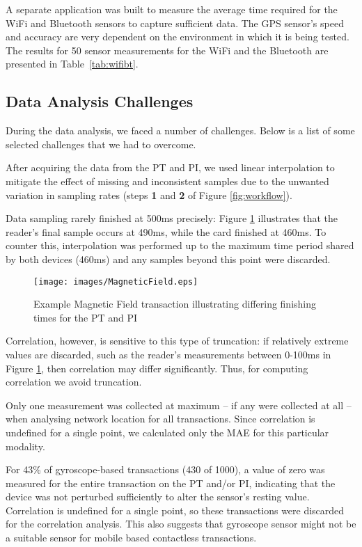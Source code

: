 \documentclass{article}
\begin{document}
        A separate application was built to measure the average time required for the WiFi and Bluetooth sensors to capture sufficient data.
		The GPS sensor's speed and accuracy are very dependent on the environment in which it is being tested.
		The results for 50 sensor measurements for the WiFi and the Bluetooth are presented in Table~\ref{tab:wifibt}.




\subsection{Data Analysis Challenges}
\label{sec:Data_Analaysis_Challenge}

During the data analysis, we faced a number of challenges.  Below is a list of some selected challenges that we had to overcome. 


After acquiring the data from the PT and PI, we used linear interpolation to mitigate the effect of missing and inconsistent samples due to the unwanted variation in sampling rates (steps \textbf{1} and \textbf{2} of Figure \ref{fig:workflow}).



Data sampling rarely finished at 500ms precisely: Figure \ref{fig:magfield} illustrates that the reader's final sample occurs at 490ms, while the card finished at 460ms.  To counter this, interpolation was performed up to the maximum time period shared by both devices (460ms) and any samples beyond this point were discarded.  

\begin{figure}[h]
\centering
\texttt{[image: images/MagneticField.eps]}
\caption{Example Magnetic Field transaction illustrating differing finishing times for the PT and PI}
\label{fig:magfield}
\end{figure}

 Correlation, however, is sensitive to this type of truncation: if relatively extreme values are discarded, such as the reader's measurements between 0-100ms in Figure \ref{fig:magfield}, then correlation may differ significantly. Thus, for computing correlation we avoid truncation.  

 Only one measurement was collected at maximum -- if any were collected at all -- when analysing network location for all transactions.  Since correlation is undefined for a single point, we calculated only the MAE for this particular modality.

For 43\% of gyroscope-based transactions (430 of 1000), a value of zero was measured for the entire transaction on the PT and/or PI, indicating that the device was not perturbed sufficiently to alter the sensor's resting value.  Correlation is undefined for a single point, so these transactions were discarded for the correlation analysis. This also suggests that gyroscope sensor might not be a suitable sensor for mobile based contactless transactions.  
\end{document}
